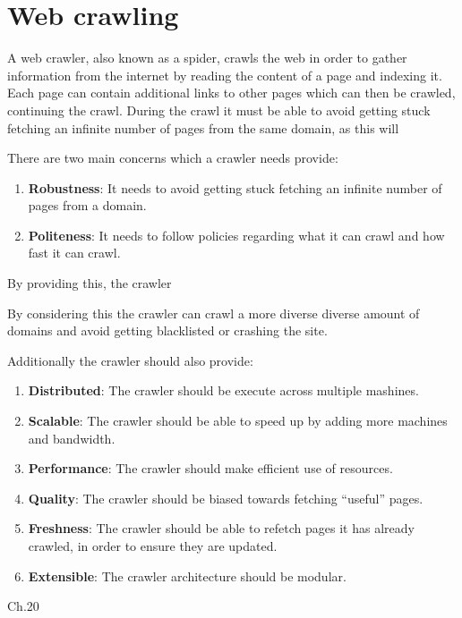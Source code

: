 \section{Web crawling}

A web crawler, also known as a spider, crawls the web in order to gather
information from the internet by reading the content of a page and indexing it.
Each page can contain additional links to other pages which can then be
crawled, continuing the crawl. During the crawl it must be able to avoid
getting stuck fetching an infinite number of pages from the same domain, as this
will 

There are two main concerns which a crawler needs provide:
\begin{enumerate}
  \item \textbf{Robustness}: It needs to avoid getting stuck fetching an
  infinite number of pages from a domain.
  \item \textbf{Politeness}: It needs to follow policies regarding what it can
  crawl and how fast it can crawl. 
\end{enumerate}

By providing this, the crawler 
 
By considering this the crawler can crawl a more diverse diverse amount of
domains and avoid getting blacklisted or crashing the site.

Additionally the crawler should also provide:
\begin{enumerate}
  \item \textbf{Distributed}: The crawler should be execute across multiple
  mashines.
  \item \textbf{Scalable}: The crawler should be able to speed up by adding more
  machines and bandwidth.
  \item \textbf{Performance}: The crawler should make efficient use of
  resources.
  \item \textbf{Quality}: The crawler should be biased towards fetching
  ``useful'' pages.
  \item \textbf{Freshness}: The crawler should be able to refetch pages it has
  already crawled, in order to ensure they are updated.
  \item \textbf{Extensible}: The crawler architecture should be modular.
\end{enumerate}
\citep{manning2008introduction}{Ch.20}






